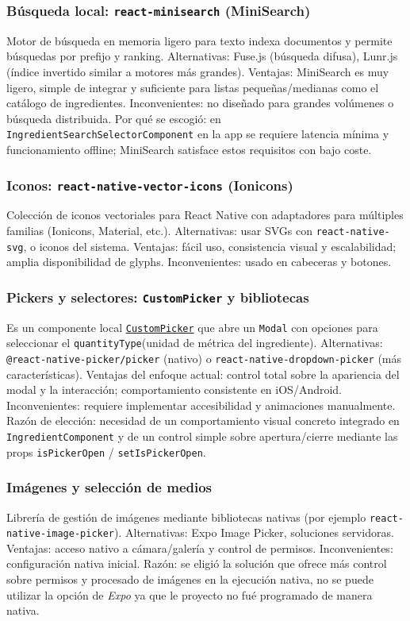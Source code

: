 \documentclass[twoside, openright, 11pt]{report}
\begin{document}
	\subsubsection*{Búsqueda local: \texttt{react-minisearch} (MiniSearch)}
	Motor de búsqueda en memoria ligero para texto indexa documentos y permite búsquedas por prefijo y ranking.  
	Alternativas: Fuse.js (búsqueda difusa), Lunr.js (índice invertido similar a motores más grandes).  
	Ventajas: MiniSearch es muy ligero, simple de integrar y suficiente para listas pequeñas/medianas como el catálogo de ingredientes. Inconvenientes: no diseñado para grandes volúmenes o búsqueda distribuida.  
	Por qué se escogió: en \texttt{IngredientSearchSelectorComponent} en la app se requiere latencia mínima y funcionamiento offline; MiniSearch satisface estos requisitos con bajo coste.
	
	\subsubsection*{Iconos: \texttt{react-native-vector-icons} (Ionicons)}
	Colección de iconos vectoriales para React Native con adaptadores para múltiples familias (Ionicons, Material, etc.).  
	Alternativas: usar SVGs con \texttt{react-native-svg}, o iconos del sistema.  
	Ventajas: fácil uso, consistencia visual y escalabilidad; amplia disponibilidad de glyphs. Inconvenientes: usado en cabeceras y botones.
	
	\subsubsection*{Pickers y selectores: \texttt{CustomPicker} y bibliotecas}
	Es un componente local \texttt{\hyperref[CustomPicker]{CustomPicker}} que abre un \texttt{Modal} con opciones para seleccionar el \texttt{quantityType}(unidad de métrica del ingrediente).
	Alternativas: \texttt{@react-native-picker/picker} (nativo) o \texttt{react-native-dropdown-picker} (más características).  
	Ventajas del enfoque actual: control total sobre la apariencia del modal y la interacción; comportamiento consistente en iOS/Android. Inconvenientes: requiere implementar accesibilidad y animaciones manualmente.  
	Razón de elección: necesidad de un comportamiento visual concreto integrado en \texttt{IngredientComponent} y de un control simple sobre apertura/cierre mediante las props \texttt{isPickerOpen} / \texttt{setIsPickerOpen}.
	
	
	
	\subsubsection*{Imágenes y selección de medios}
	Librería de gestión de imágenes mediante bibliotecas nativas (por ejemplo \texttt{react-native-image-picker}).  
	Alternativas: Expo Image Picker, soluciones servidoras.  
	Ventajas: acceso nativo a cámara/galería y control de permisos. Inconvenientes: configuración nativa inicial.  
	Razón: se eligió la solución que ofrece más control sobre permisos y procesado de imágenes en la ejecución nativa, no se puede utilizar la opción de \textit{Expo} ya que le proyecto no fué programado de manera nativa.
  
\end{document}
